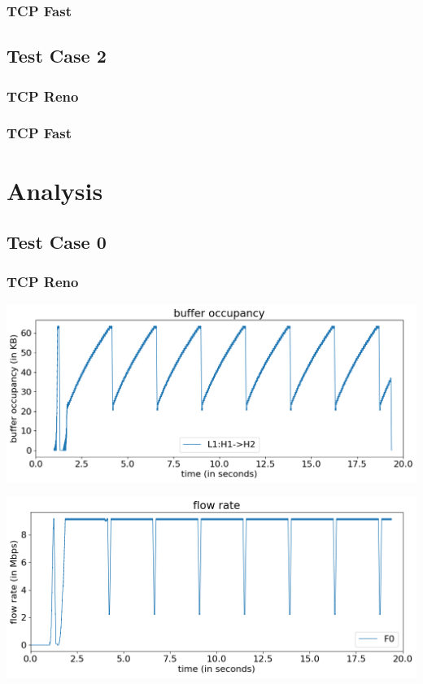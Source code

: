 \documentclass{article}
\begin{document}
\subsubsection{TCP Fast}

\subsection{Test Case 2}

\subsubsection{TCP Reno}

\subsubsection{TCP Fast}

\section{Analysis}

\subsection{Test Case 0}

\subsubsection{TCP Reno}

\includegraphics[width = \textwidth]{"test_case0_reno buffer occupancy"}

\includegraphics[width = \textwidth]{"test_case0_reno flow rate"}
\end{document}
